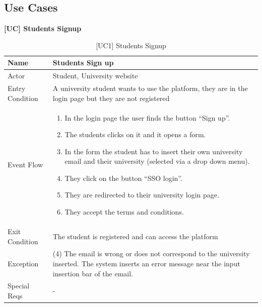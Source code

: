 \subsection{Use Cases}


\newcommand{\nextUseCases}{}

\textbf{[UC\nextUseCases] Students Signup}
\begin{table}[H] %
    \centering
    \begin{tabular}{|p{3cm}|p{10cm}|} 
    \hline
    Name & Students Sign up \\ \hline
    Actor  & Student, University website\\ \hline
    Entry Condition  & A university student wants to use the platform, they are in the login page but they are not registered \\ \hline
    Event Flow  & 
    \begin{enumerate}[noitemsep, topsep=0pt]
        \item In the login page the user finds the button “Sign up”.
        \item The students clicks on it and it opens a form.
        \item In the form the student has to insert their own university email and their university (selected via a drop down menu).
        \item They click on the button “SSO login”.
        \item They are redirected to their university login page.
        \item They accept the terms and conditions.
    \end{enumerate} \\ \hline
    Exit Condition  & The student is registered and can access the platform \\ \hline
    Exception  & (4) The email is wrong or does not correspond to the university inserted. The system inserts an error message near the input insertion bar of the email. \\ \hline
    Special Reqs  & - \\ \hline
    \end{tabular}
    \caption{[UC1] Students Signup}
\end{table}

